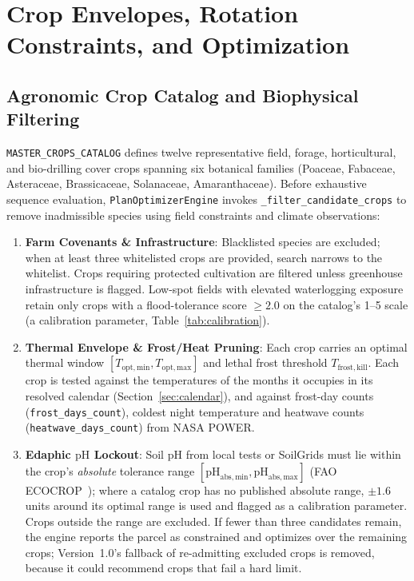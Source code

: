 \section{Crop Envelopes, Rotation Constraints, and Optimization}
\label{sec:optimization}

\subsection{Agronomic Crop Catalog and Biophysical Filtering}
\texttt{MASTER\_CROPS\_CATALOG} defines twelve representative field, forage, horticultural, and bio-drilling cover crops spanning six botanical families (Poaceae, Fabaceae, Asteraceae, Brassicaceae, Solanaceae, Amaranthaceae). Before exhaustive sequence evaluation, \texttt{PlanOptimizerEngine} invokes \texttt{\_filter\_candidate\_crops} to remove inadmissible species using field constraints and climate observations:
\begin{enumerate}[leftmargin=1.5em]
  \item \textbf{Farm Covenants \& Infrastructure}: Blacklisted species are excluded; when at least three whitelisted crops are provided, search narrows to the whitelist. Crops requiring protected cultivation are filtered unless greenhouse infrastructure is flagged. Low-spot fields with elevated waterlogging exposure retain only crops with a flood-tolerance score $\ge 2.0$ on the catalog's 1--5 scale (a calibration parameter, Table~\ref{tab:calibration}).
  \item \textbf{Thermal Envelope \& Frost/Heat Pruning}: Each crop carries an optimal thermal window $[T_{\mathrm{opt,min}}, T_{\mathrm{opt,max}}]$ and lethal frost threshold $T_{\mathrm{frost,kill}}$. Each crop is tested against the temperatures of the months it occupies in its resolved calendar (Section~\ref{sec:calendar}), and against frost-day counts (\texttt{frost\_days\_count}), coldest night temperature and heatwave counts (\texttt{heatwave\_days\_count}) from NASA POWER.
  \item \textbf{Edaphic $\mathrm{pH}$ Lockout}: Soil $\mathrm{pH}$ from local tests or SoilGrids must lie within the crop's \emph{absolute} tolerance range $[\mathrm{pH}_{\mathrm{abs,min}}, \mathrm{pH}_{\mathrm{abs,max}}]$ (FAO ECOCROP~\cite{fao_ecocrop}); where a catalog crop has no published absolute range, $\pm 1.6$ units around its optimal range is used and flagged as a calibration parameter. Crops outside the range are excluded. If fewer than three candidates remain, the engine reports the parcel as constrained and optimizes over the remaining crops; Version~1.0's fallback of re-admitting excluded crops is removed, because it could recommend crops that fail a hard limit.
\end{enumerate}

